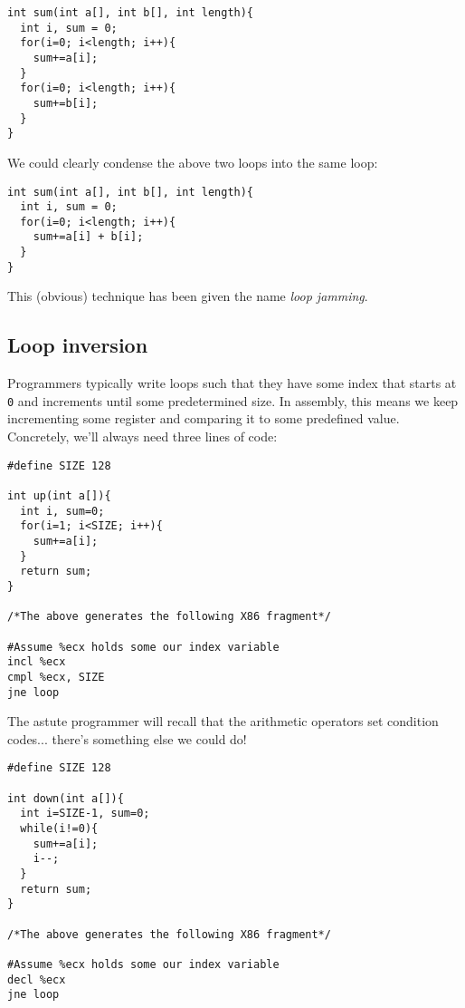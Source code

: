 \documentclass[10pt]{article}
\renewcommand{\#}{\raisebox{.22ex}{\large\old}}
\begin{document}
\begin{lstlisting}
int sum(int a[], int b[], int length){
  int i, sum = 0;
  for(i=0; i<length; i++){
    sum+=a[i];
  }
  for(i=0; i<length; i++){
    sum+=b[i];
  }
}
\end{lstlisting}

\newpage

\noindent We could clearly condense the above two loops into the same loop:

\begin{lstlisting}
int sum(int a[], int b[], int length){
  int i, sum = 0;
  for(i=0; i<length; i++){
    sum+=a[i] + b[i];
  }
}
\end{lstlisting}

\noindent This (obvious) technique has been given the name \textit{loop jamming}.

\subsection{Loop inversion}
Programmers typically write loops such that they have some index that starts at \texttt{0} and increments until some predetermined size. In assembly, this means we keep incrementing some register and comparing it to some predefined value. Concretely, we'll always need three lines of code:


\begin{lstlisting}
#define SIZE 128

int up(int a[]){
  int i, sum=0;
  for(i=1; i<SIZE; i++){
    sum+=a[i];
  }
  return sum;
}

/*The above generates the following X86 fragment*/

#Assume %ecx holds some our index variable
incl %ecx
cmpl %ecx, SIZE
jne loop

\end{lstlisting}

\noindent The astute programmer will recall that the arithmetic operators set condition codes... there's something else we could do!

\begin{lstlisting}
#define SIZE 128

int down(int a[]){
  int i=SIZE-1, sum=0;
  while(i!=0){
    sum+=a[i];
    i--;
  }
  return sum;
}

/*The above generates the following X86 fragment*/

#Assume %ecx holds some our index variable
decl %ecx
jne loop
\end{lstlisting}
\end{document}
